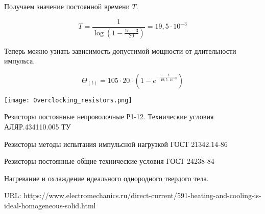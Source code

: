 \documentclass[a4paper]{article}
\begin{document}
    Получаем значение постоянной времени $T$.

\begin{equation}
T=\frac{1}{\log{(1-\frac{1e-3}{20})}}=19,5{\cdot}10^{-3}
\end{equation}

    Теперь можно узнать зависимость допустимой мощности от длительности импульса.

\begin{equation}
\Theta_{(t)} = 105{\cdot}20{\cdot}(1-e^{-\frac{t}{19,5{\cdot}10^{-3}}})
\end{equation}

\texttt{[image: Overclocking\_resistors.png]}

\begin{thebibliography}{2}
Резисторы постоянные непроволочные Р1-12. Технические условия АЛЯР.434110.005 ТУ

Резисторы методы испытания импульсной нагрузкой ГОСТ 21342.14-86

Резисторы постоянные общие технические условия ГОСТ 24238-84

Нагревание и охлаждение идеального однородного твердого тела.

URL: https://www.electromechanics.ru/direct-current/591-heating-and-cooling-is-ideal-homogeneous-solid.html
\end{thebibliography}
\end{document}
